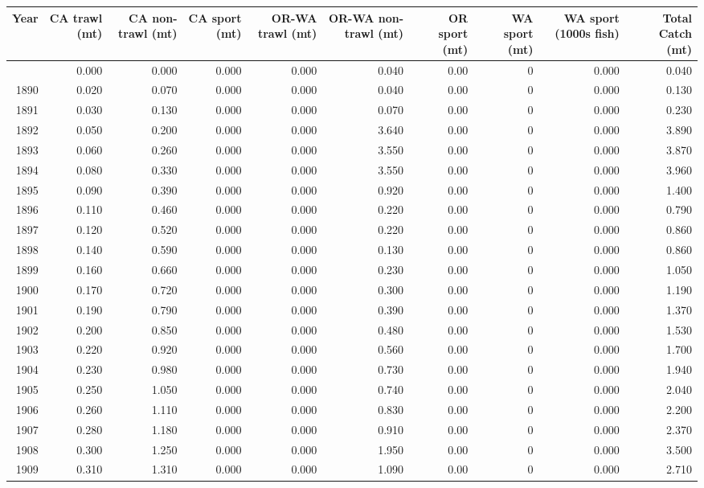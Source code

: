 \documentclass[
]{scrartcl}
\begin{document}
\begin{longtable}{rrrrrrrrrr}
\toprule
Year & CA trawl (mt) & CA non-trawl (mt) & CA sport (mt) & OR-WA trawl (mt) & OR-WA non-trawl (mt) & OR sport (mt) & WA sport (mt) & WA sport (1000s fish) & Total Catch (mt) \\ 
\midrule\addlinespace[2.5pt]
1889 & 0.000 & 0.000 & 0.000 & 0.000 & 0.040 & 0.00 & 0 & 0.000 & 0.040 \\ 
1890 & 0.020 & 0.070 & 0.000 & 0.000 & 0.040 & 0.00 & 0 & 0.000 & 0.130 \\ 
1891 & 0.030 & 0.130 & 0.000 & 0.000 & 0.070 & 0.00 & 0 & 0.000 & 0.230 \\ 
1892 & 0.050 & 0.200 & 0.000 & 0.000 & 3.640 & 0.00 & 0 & 0.000 & 3.890 \\ 
1893 & 0.060 & 0.260 & 0.000 & 0.000 & 3.550 & 0.00 & 0 & 0.000 & 3.870 \\ 
1894 & 0.080 & 0.330 & 0.000 & 0.000 & 3.550 & 0.00 & 0 & 0.000 & 3.960 \\ 
1895 & 0.090 & 0.390 & 0.000 & 0.000 & 0.920 & 0.00 & 0 & 0.000 & 1.400 \\ 
1896 & 0.110 & 0.460 & 0.000 & 0.000 & 0.220 & 0.00 & 0 & 0.000 & 0.790 \\ 
1897 & 0.120 & 0.520 & 0.000 & 0.000 & 0.220 & 0.00 & 0 & 0.000 & 0.860 \\ 
1898 & 0.140 & 0.590 & 0.000 & 0.000 & 0.130 & 0.00 & 0 & 0.000 & 0.860 \\ 
1899 & 0.160 & 0.660 & 0.000 & 0.000 & 0.230 & 0.00 & 0 & 0.000 & 1.050 \\ 
1900 & 0.170 & 0.720 & 0.000 & 0.000 & 0.300 & 0.00 & 0 & 0.000 & 1.190 \\ 
1901 & 0.190 & 0.790 & 0.000 & 0.000 & 0.390 & 0.00 & 0 & 0.000 & 1.370 \\ 
1902 & 0.200 & 0.850 & 0.000 & 0.000 & 0.480 & 0.00 & 0 & 0.000 & 1.530 \\ 
1903 & 0.220 & 0.920 & 0.000 & 0.000 & 0.560 & 0.00 & 0 & 0.000 & 1.700 \\ 
1904 & 0.230 & 0.980 & 0.000 & 0.000 & 0.730 & 0.00 & 0 & 0.000 & 1.940 \\ 
1905 & 0.250 & 1.050 & 0.000 & 0.000 & 0.740 & 0.00 & 0 & 0.000 & 2.040 \\ 
1906 & 0.260 & 1.110 & 0.000 & 0.000 & 0.830 & 0.00 & 0 & 0.000 & 2.200 \\ 
1907 & 0.280 & 1.180 & 0.000 & 0.000 & 0.910 & 0.00 & 0 & 0.000 & 2.370 \\ 
1908 & 0.300 & 1.250 & 0.000 & 0.000 & 1.950 & 0.00 & 0 & 0.000 & 3.500 \\ 
1909 & 0.310 & 1.310 & 0.000 & 0.000 & 1.090 & 0.00 & 0 & 0.000 & 2.710 \\ 

\end{longtable}
\end{document}
